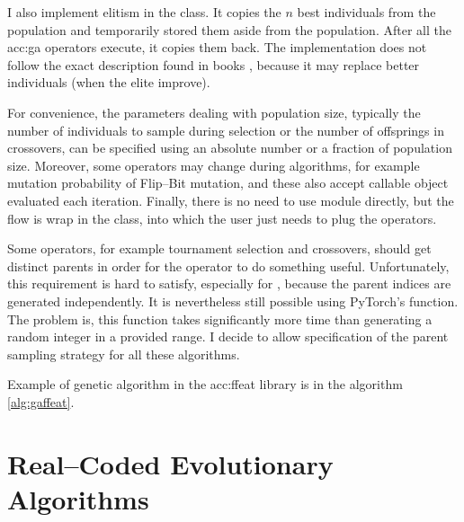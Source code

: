 I also implement elitism in the  class. It copies the $n$ best individuals from the population and temporarily stored them aside from the population. After all the \acrshort{acc:ga} operators execute, it copies them back. The implementation does not follow the exact description found in books \citep{IntroductionToEA}, because it may replace better individuals (when the elite improve).

For convenience, the parameters dealing with population size, typically the number of individuals to sample during selection or the number of offsprings in crossovers, can be specified using an absolute number or a fraction of population size. Moreover, some operators may change during algorithms, for example mutation probability of Flip--Bit mutation, and these also accept callable object evaluated each iteration. Finally, there is no need to use  module directly, but the flow is wrap in the  class, into which the user just needs to plug the operators.

Some operators, for example tournament selection and crossovers, should get distinct parents in order for the operator to do something useful. Unfortunately, this requirement is hard to satisfy, especially for \gpuns, because the parent indices are generated independently. It is nevertheless still possible using PyTorch's  function. The problem is, this function takes significantly more time than generating a random integer in a provided range. I decide to allow specification of the parent sampling strategy for all these algorithms.

Example of genetic algorithm in the \acrshort{acc:ffeat} library is in the algorithm \ref{alg:gaffeat}.




\section{Real--Coded Evolutionary Algorithms}

